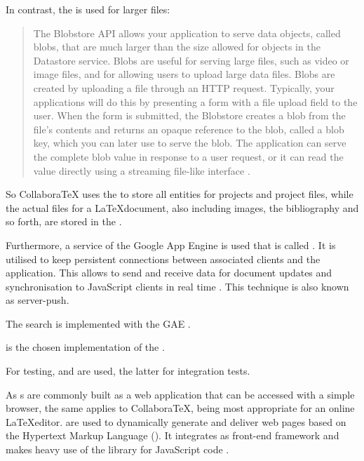 In contrast, the  is used for larger files:

\begin{quote}
The Blobstore API allows your application to serve data objects, called blobs, that are much larger than the size allowed for objects in the Datastore service. Blobs are useful for serving large files, such as video or image files, and for allowing users to upload large data files. Blobs are created by uploading a file through an HTTP request. Typically, your applications will do this by presenting a form with a file upload field to the user. When the form is submitted, the Blobstore creates a blob from the file's contents and returns an opaque reference to the blob, called a blob key, which you can later use to serve the blob. The application can serve the complete blob value in response to a user request, or it can read the value directly using a streaming file-like interface \cite{website:gae-blobstore}.
\end{quote}

\label{gae-services}
So CollaboraTeX uses the  to store all entities for projects and project files, while the actual files for a \LaTeX document, also including images, the bibliography and so forth, are stored in the .

Furthermore, a service of the Google App Engine is used that is called . It is utilised to keep persistent connections between associated clients and the application. This allows to send and receive data for document updates and synchronisation to JavaScript clients in real time \cite{website:gae-channel-api}. This technique is also known as server-push.

The search is implemented with the GAE  \cite{website:gae-search-api}.

 is the chosen implementation of the .

For testing,  and  are used, the latter for integration tests.

As s are commonly built as a web application that can be accessed with a simple browser, the same applies to CollaboraTeX, being most appropriate for an online \LaTeX editor.  are used to dynamically generate and deliver web pages based on the Hypertext Markup Language (). It integrates  as front-end framework and makes heavy use of the library  for JavaScript code \cite{website:bootstrap} \cite{website:jquery}.

